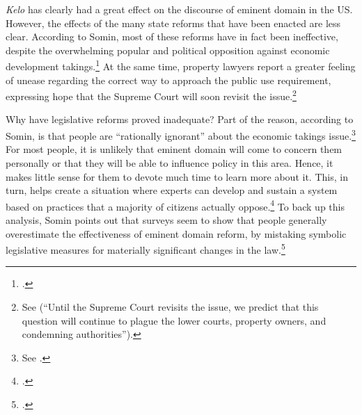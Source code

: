 
{\it Kelo} has clearly had a great effect on the discourse of eminent domain in the US. However, the effects of the many state reforms that have been enacted are less clear. According to Somin, most of these reforms have in fact been ineffective, despite the overwhelming popular and political opposition against economic development takings.\footcite[2170-2171]{somin09} At the same time, property lawyers report a greater feeling of unease regarding the correct way to approach the public use requirement, expressing hope that the Supreme Court will soon revisit the issue.\footnote{See \cite{murakami13} (``Until the Supreme Court revisits the issue, we predict that this question will continue to plague the lower courts, property owners, and condemning authorities'').} 

Why have legislative reforms proved inadequate? Part of the reason, according to Somin, is that people are ``rationally ignorant'' about the economic takings issue.\footnote{See \cite[2170]{somin09}.} For most people, it is unlikely that eminent domain will come to concern them personally or that they will be able to influence policy in this area. Hence, it makes little sense for them to devote much time to learn more about it. This, in turn, helps create a situation where experts can develop and sustain a system based on practices that a majority of citizens actually oppose.\footcite[2163-2171]{somin09} To back up this analysis, Somin points out that surveys seem to show that people generally overestimate the effectiveness of eminent domain reform, by mistaking symbolic legislative measures for materially significant changes in the law.\footcite[2155-2157]{somin09}

